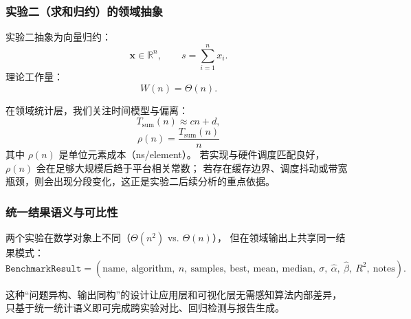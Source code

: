 \subsubsection{实验二（求和归约）的领域抽象}

实验二抽象为向量归约：
\begin{equation}
\mathbf{x}\in\mathbb{R}^{n},\qquad s=\sum_{i=1}^{n}x_i.
\end{equation}
理论工作量：
\begin{equation}
W(n)=\Theta(n).
\end{equation}

在领域统计层，我们关注时间模型与偏离：
\begin{equation}
T_{\text{sum}}(n)\approx c n + d,
\end{equation}
\begin{equation}
\rho(n)=\frac{T_{\text{sum}}(n)}{n}
\end{equation}
其中 \(\rho(n)\) 是单位元素成本（ns/element）。
若实现与硬件调度匹配良好，\(\rho(n)\) 会在足够大规模后趋于平台相关常数；
若存在缓存边界、调度抖动或带宽瓶颈，则会出现分段变化，这正是实验二后续分析的重点依据。

\subsubsection{统一结果语义与可比性}

两个实验在数学对象上不同（\(\Theta(n^2)\) vs. \(\Theta(n)\)），
但在领域输出上共享同一结果模式：
\begin{equation}
\texttt{BenchmarkResult}=
(\text{name},\ \text{algorithm},\ n,\ \text{samples},\ \text{best},\ \text{mean},\ \text{median},\ \sigma,\ \hat\alpha,\ \hat\beta,\ R^2,\ \text{notes}).
\end{equation}

这种“问题异构、输出同构”的设计让应用层和可视化层无需感知算法内部差异，
只基于统一统计语义即可完成跨实验对比、回归检测与报告生成。

